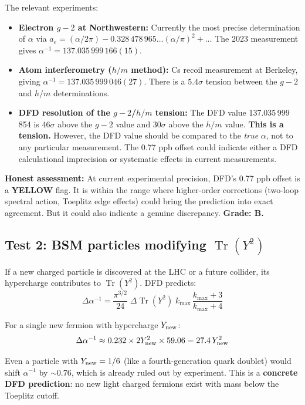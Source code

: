 \documentclass[11pt,a4paper]{article}
\newcommand{\YELLOW}{\textcolor{dfdyellow}{\textbf{YELLOW}}}
\newcommand{\Tr}{\operatorname{Tr}}
\begin{document}
The relevant experiments:
\begin{itemize}
\item \textbf{Electron $g-2$ at Northwestern:} Currently the most precise determination of $\alpha$ via $a_e = (\alpha/2\pi) - 0.328\,478\,965\ldots(\alpha/\pi)^2 + \ldots$ The 2023 measurement gives $\alpha^{-1} = 137.035\,999\,166(15)$.
\item \textbf{Atom interferometry ($h/m$ method):} Cs recoil measurement at Berkeley, giving $\alpha^{-1} = 137.035\,999\,046(27)$. There is a $5.4\sigma$ tension between the $g-2$ and $h/m$ determinations.
\item \textbf{DFD resolution of the $g-2$/$h/m$ tension:} The DFD value 137.035\,999\,854 is 46$\sigma$ above the $g-2$ value and 30$\sigma$ above the $h/m$ value. \textbf{This is a tension.} However, the DFD value should be compared to the \emph{true} $\alpha$, not to any particular measurement. The 0.77 ppb offset could indicate either a DFD calculational imprecision or systematic effects in current measurements.
\end{itemize}

\textbf{Honest assessment:} At current experimental precision, DFD's 0.77 ppb offset is a \YELLOW{} flag. It is within the range where higher-order corrections (two-loop spectral action, Toeplitz edge effects) could bring the prediction into exact agreement. But it could also indicate a genuine discrepancy. \textbf{Grade: B.}

\subsection{Test 2: BSM particles modifying $\Tr(Y^2)$}

If a new charged particle is discovered at the LHC or a future collider, its hypercharge contributes to $\Tr(Y^2)$. DFD predicts:
\begin{equation}
\Delta\alpha^{-1} = \frac{\pi^{3/2}}{24}\;\Delta\Tr(Y^2)\;k_{\max}\,\frac{k_{\max}+3}{k_{\max}+4}
\end{equation}

For a single new fermion with hypercharge $Y_{\rm new}$:
\begin{equation}
\Delta\alpha^{-1} \approx 0.232 \times 2Y_{\rm new}^2 \times 59.06 = 27.4\,Y_{\rm new}^2
\end{equation}

Even a particle with $Y_{\rm new} = 1/6$ (like a fourth-generation quark doublet) would shift $\alpha^{-1}$ by $\sim 0.76$, which is already ruled out by experiment. This is a \textbf{concrete DFD prediction}: no new light charged fermions exist with mass below the Toeplitz cutoff.
\end{document}
